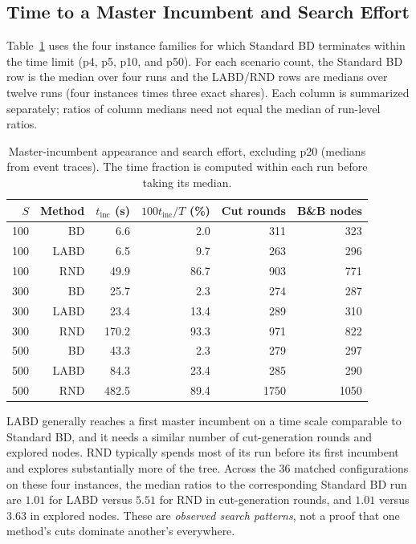 \subsection{Time to a Master Incumbent and Search Effort}\label{app:trace-incumbents}

Table~\ref{tab:trace-incumbents} uses the four instance families for which Standard BD terminates within the time limit (p4, p5, p10, and p50). For each scenario count, the Standard BD row is the median over four runs and the LABD/RND rows are medians over twelve runs (four instances times three exact shares). Each column is summarized separately; ratios of column medians need not equal the median of run-level ratios.

\begin{table}[ht]
\centering
\caption{Master-incumbent appearance and search effort, excluding p20 (medians from event traces). The time fraction is computed within each run before taking its median.}
\label{tab:trace-incumbents}
\scriptsize
\setlength{\tabcolsep}{4pt}
\begin{tabular}{rr r r r r}
\toprule
$S$ & Method & $t_{\mathrm{inc}}$ (s) & $100t_{\mathrm{inc}}/T$ (\%) & Cut rounds & B\&B nodes\\
\midrule
100 & BD   & 6.6  & 2.0  & 311 & 323\\
100 & LABD & 6.5  & 9.7  & 263 & 296\\
100 & RND  & 49.9 & 86.7 & 903 & 771\\
\midrule
300 & BD   & 25.7  & 2.3  & 274 & 287\\
300 & LABD & 23.4  & 13.4 & 289 & 310\\
300 & RND  & 170.2 & 93.3 & 971 & 822\\
\midrule
500 & BD   & 43.3  & 2.3  & 279 & 297\\
500 & LABD & 84.3  & 23.4 & 285 & 290\\
500 & RND  & 482.5 & 89.4 & 1750 & 1050\\
\bottomrule
\end{tabular}
\end{table}

LABD generally reaches a first master incumbent on a time scale comparable to Standard BD, and it needs a similar number of cut-generation rounds and explored nodes. RND typically spends most of its run before its first incumbent and explores substantially more of the tree. Across the 36 matched configurations on these four instances, the median ratios to the corresponding Standard BD run are $1.01$ for LABD versus $5.51$ for RND in cut-generation rounds, and $1.01$ versus $3.63$ in explored nodes. These are \emph{observed search patterns}, not a proof that one method's cuts dominate another's everywhere.

